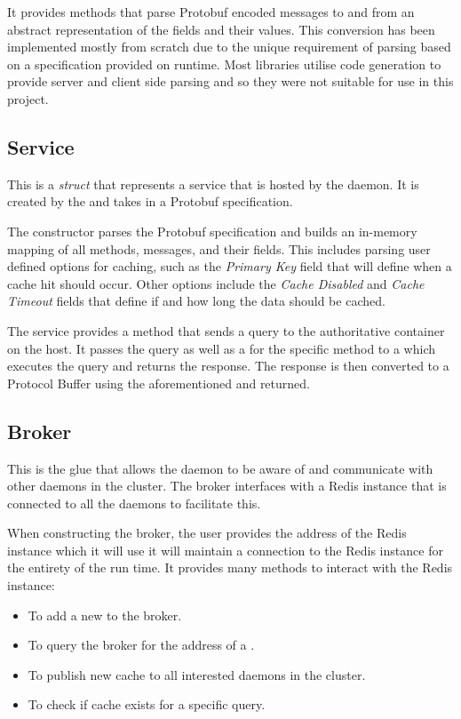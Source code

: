 \documentclass[a4paper,12pt]{report}
\begin{document}
It provides methods that parse Protobuf encoded messages to and from an abstract representation of the fields and their values. This conversion has been
implemented mostly from scratch due to the unique requirement of parsing based on a specification provided on runtime. Most libraries utilise code generation
to provide server and client side parsing and so they were not suitable for use in this project.

\subsection{Service}
\label{sec:service}
This is a \textit{struct} that represents a service that is hosted by the daemon. It is created by the \textit{} and
takes in a Protobuf specification.

The constructor parses the Protobuf specification and builds an in-memory mapping of all methods, messages, and their fields.
This includes parsing user defined options for caching, such as the \textit{Primary Key} field that will define when a cache hit should occur.
Other options include the \textit{Cache Disabled} and \textit{Cache Timeout} fields that define if and how long the data should be cached.

The service provides a method that sends a query to the authoritative container on the host.
It passes the query as well as a \textit{} for the specific method to a \textit{} which executes the query
and returns the response. The response is then converted to a Protocol Buffer using the aforementioned \textit{} and returned.

\subsection{Broker}
\label{sec:broker}

This is the glue that allows the daemon to be aware of and communicate with other daemons in the cluster.
The broker interfaces with a Redis \cite{redis} instance that is connected to all the daemons to facilitate this.

When constructing the broker, the user provides the address of the Redis instance which it will use it will maintain a connection to the Redis instance for the entirety of the run time.
It provides many methods to interact with the Redis instance:
\begin{itemize}
    \item To add a new \textit{} to the broker.
    \item To query the broker for the address of a \textit{}.
    \item To publish new cache to all interested daemons in the cluster.
    \item To check if cache exists for a specific query.
\end{itemize}
\end{document}
